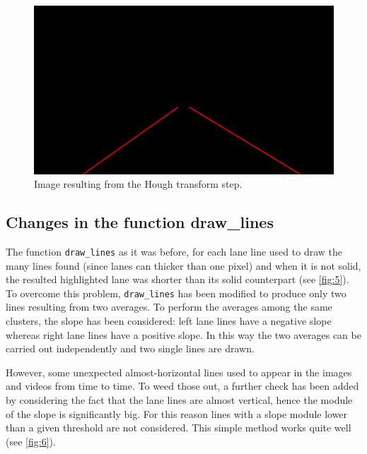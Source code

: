 \documentclass{article}
\let\cd\lstinline
\begin{document}
\begin{figure}
\centering
\includegraphics[scale=0.4]{lane_detection_steps/solidYellowCurve/4.jpg}
\caption{Image resulting from the Hough transform step.}
\label{fig:4}
\end{figure}

\subsection{Changes in the function draw\_lines}
The function \cd+draw_lines+ as it was before, for each lane line used to draw the many lines found (since lanes can thicker than one pixel) and when it is not solid, the resulted highlighted lane was shorter than its solid counterpart (see \autoref{fig:5}). To overcome this problem, \cd+draw_lines+ has been modified to produce only two lines resulting from two averages. To perform the averages among the same clusters, the slope has been considered: left lane lines have a negative slope whereas right lane lines have a positive slope. In this way the two averages can be carried out independently and two single lines are drawn.

However, some unexpected almost-horizontal lines used to appear in the images and videos from time to time. To weed those out, a further check has been added by considering the fact that the lane lines are almost vertical, hence the module of the slope is significantly big. For this reason lines with a slope module lower than a given threshold are not considered. This simple method works quite well (see \autoref{fig:6}).
\end{document}
